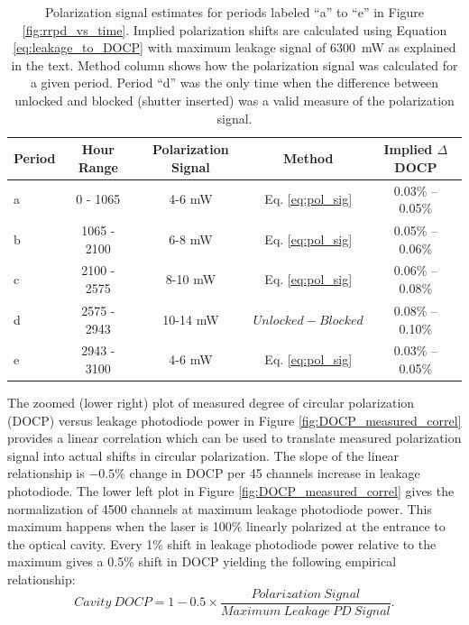 \begin{table}[!!h]
\begin{center}
\caption{\label{tab:pol_sig}Polarization signal estimates for periods labeled ``a'' to ``e'' in Figure \ref{fig:rrpd_vs_time}. Implied polarization shifts are calculated using Equation \ref{eq:leakage_to_DOCP} with maximum leakage signal of 6300~mW as explained in the text. Method column shows how the polarization signal was calculated for a given period. Period ``d'' was the only time when the difference between unlocked and blocked (shutter inserted) was a valid measure of the polarization signal.}
\begin{tabular}{l|c|c|c|c}\hline
Period&Hour Range&Polarization Signal&Method&Implied $\Delta$DOCP\\ \hline
a&0 - 1065&4-6 mW&Eq. \ref{eq:pol_sig}&0.03\% -- 0.05\%\\
b&1065 - 2100&6-8 mW&Eq. \ref{eq:pol_sig}&0.05\% -- 0.06\%\\
c&2100 - 2575&8-10 mW&Eq. \ref{eq:pol_sig}&0.06\% -- 0.08\%\\
d&2575 - 2943&10-14 mW&$Unlocked-Blocked$&0.08\% -- 0.10\%\\
e&2943 - 3100&4-6 mW&Eq. \ref{eq:pol_sig}&0.03\% -- 0.05\%\\\hline
\end{tabular}
\end{center}
\end{table}  

The zoomed (lower right) plot of measured degree of circular polarization (DOCP) versus leakage photodiode power in Figure \ref {fig:DOCP_measured_correl} provides a linear correlation which can be used to translate measured polarization signal into actual shifts in circular polarization. The slope of the linear relationship is $-0.5\%$ change in DOCP per 45 channels increase in leakage photodiode. The lower left plot in Figure \ref {fig:DOCP_measured_correl} gives the normalization of 4500 channels at maximum leakage photodiode power. This maximum happens when the laser is 100\% linearly polarized at the entrance to the optical cavity. Every 1\% shift in leakage photodiode power relative to the maximum gives a 0.5\% shift in DOCP yielding the following empirical relationship:
\begin{equation}
Cavity~DOCP = 1-0.5\times\frac{Polarization~Signal}{Maximum~Leakage~PD~Signal}.
\label{eq:leakage_to_DOCP}
\end{equation}

